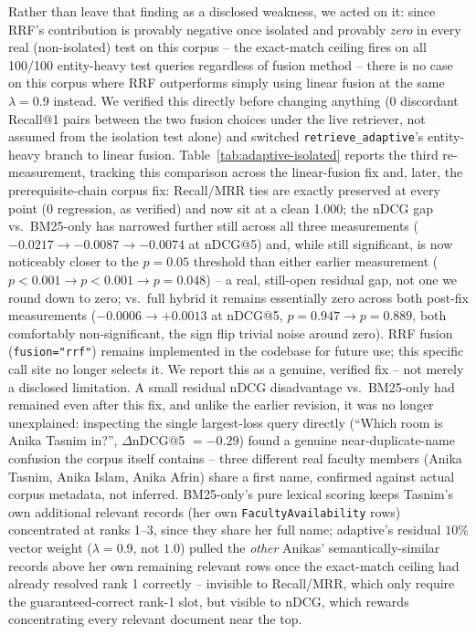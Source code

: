 \documentclass[a4paper,twoside]{article}
\begin{document}
Rather than leave that finding as a disclosed weakness, we acted on it: since RRF's contribution is provably negative once isolated and provably \emph{zero} in every real (non-isolated) test on this corpus -- the exact-match ceiling fires on all 100/100 entity-heavy test queries regardless of fusion method -- there is no case on this corpus where RRF outperforms simply using linear fusion at the same $\lambda=0.9$ instead. We verified this directly before changing anything (0 discordant Recall@1 pairs between the two fusion choices under the live retriever, not assumed from the isolation test alone) and switched \texttt{retrieve\_adaptive}'s entity-heavy branch to linear fusion. Table~\ref{tab:adaptive-isolated} reports the third re-measurement, tracking this comparison across the linear-fusion fix and, later, the prerequisite-chain corpus fix: Recall/MRR ties are exactly preserved at every point (0 regression, as verified) and now sit at a clean 1.000; the nDCG gap vs.\ BM25-only has narrowed further still across all three measurements ($-0.0217\to-0.0087\to-0.0074$ at nDCG@5) and, while still significant, is now noticeably closer to the $p=0.05$ threshold than either earlier measurement ($p<0.001\to p<0.001\to p=0.048$) -- a real, still-open residual gap, not one we round down to zero; vs.\ full hybrid it remains essentially zero across both post-fix measurements ($-0.0006\to+0.0013$ at nDCG@5, $p=0.947\to p=0.889$, both comfortably non-significant, the sign flip trivial noise around zero). RRF fusion (\texttt{fusion="rrf"}) remains implemented in the codebase for future use; this specific call site no longer selects it. We report this as a genuine, verified fix -- not merely a disclosed limitation. A small residual nDCG disadvantage vs.\ BM25-only had remained even after this fix, and unlike the earlier revision, it was no longer unexplained: inspecting the single largest-loss query directly (``Which room is Anika Tasnim in?'', $\Delta$nDCG@5 $=-0.29$) found a genuine near-duplicate-name confusion the corpus itself contains -- three different real faculty members (Anika Tasnim, Anika Islam, Anika Afrin) share a first name, confirmed against actual corpus metadata, not inferred. BM25-only's pure lexical scoring keeps Tasnim's own additional relevant records (her own \texttt{FacultyAvailability} rows) concentrated at ranks 1--3, since they share her full name; adaptive's residual $10\%$ vector weight ($\lambda=0.9$, not $1.0$) pulled the \emph{other} Anikas' semantically-similar records above her own remaining relevant rows once the exact-match ceiling had already resolved rank 1 correctly -- invisible to Recall/MRR, which only require the guaranteed-correct rank-1 slot, but visible to nDCG, which rewards concentrating every relevant document near the top.
\end{document}
